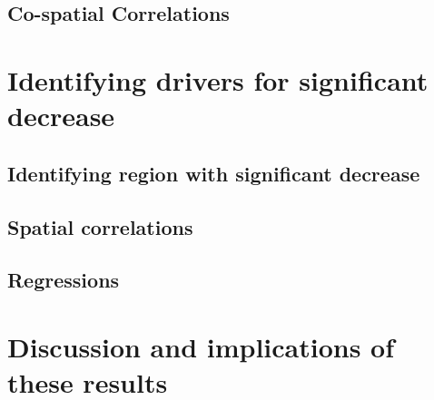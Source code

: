 \documentclass[../main.tex]{subfiles}
\begin{document}
\subsection{Co-spatial Correlations}

\section{Identifying drivers for significant decrease}

\subsection{Identifying region with significant decrease}

\subsection{Spatial correlations}

\subsection{Regressions}

\section{Discussion and implications of these results}
\end{document}
